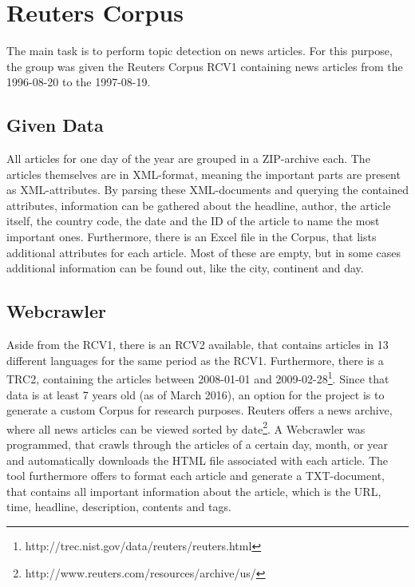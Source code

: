 \section{Reuters Corpus}\label{sec:Corpus}
The main task is to perform topic detection on news articles. For this purpose, the group was given the Reuters Corpus RCV1 containing news articles from the 1996-08-20 to the 1997-08-19.

\subsection{Given Data}\label{sec:Given}
All articles for one day of the year are grouped in a ZIP-archive each. The articles themselves are in XML-format, meaning the important parts are present as XML-attributes. By parsing these XML-documents and querying the contained attributes, information can be gathered about the headline, author, the article itself, the country code, the date and the ID of the article to name the most important ones. Furthermore, there is an Excel file in the Corpus, that lists additional attributes for each article. Most of these are empty, but in some cases additional information can be found out, like the city, continent and day.

\subsection{Webcrawler}\label{sec:Webcrawler}
Aside from the RCV1, there is an RCV2 available, that contains articles in 13 different languages for the same period as the RCV1. Furthermore, there is a TRC2, containing the articles between 2008-01-01 and 2009-02-28\footnote{http://trec.nist.gov/data/reuters/reuters.html}. Since that data is at least 7 years old (as of March 2016), an option for the project is to generate a custom Corpus for research purposes. Reuters offers a news archive, where all news articles can be viewed sorted by date\footnote{http://www.reuters.com/resources/archive/us/}. A Webcrawler was programmed, that crawls through the articles of a certain day, month, or year and automatically downloads the HTML file associated with each article. The tool furthermore offers to format each article and generate a TXT-document, that contains all important information about the article, which is the URL, time, headline, description, contents and tags.

